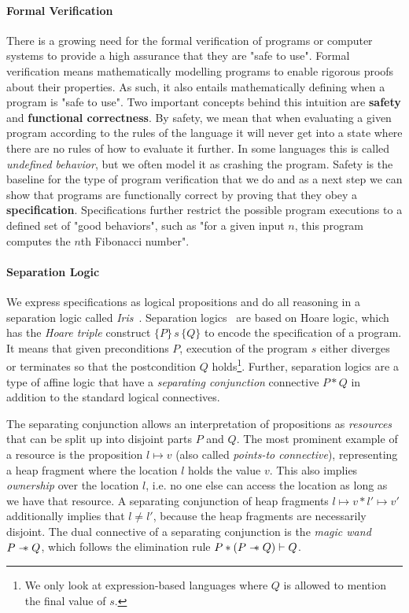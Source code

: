 \paragraph{Formal Verification}
There is a growing need for the formal verification of programs or computer systems to provide a high assurance that they are "safe to use".
Formal verification means mathematically modelling programs to enable rigorous proofs about their properties.
As such, it also entails mathematically defining when a program is "safe to use".
Two important concepts behind this intuition are \textbf{safety} and \textbf{functional correctness}.
By safety, we mean that when evaluating a given program according to the rules of the language
it will never get into a state where there are no rules of how to evaluate it further.
In some languages this is called \emph{undefined behavior}, but we often model it as crashing the program.
Safety is the baseline for the type of program verification that we do and as a next step we can show that programs are functionally correct by proving that they obey a \textbf{specification}.
Specifications further restrict the possible program executions to a defined set of "good behaviors", such as "for a given input \(n\), this program computes the \(n\)th Fibonacci number".

\paragraph{Separation Logic}
We express specifications as logical propositions and do all reasoning in a separation logic called \emph{Iris}~\cite{jung2018iris}.
Separation logics~\cite{?} are based on Hoare logic, which has the \emph{Hoare triple} construct \(\{P\}\,s\,\{Q\}\) to encode the specification of a program.
It means that given preconditions \(P\), execution of the program \(s\) either diverges or terminates so that the postcondition \(Q\) holds\footnote{We only look at expression-based languages where \(Q\) is allowed to mention the final value of \(s\).}.
Further, separation logics are a type of affine logic that have a \emph{separating conjunction} connective \(P \ast Q\) in addition to the standard logical connectives.

The separating conjunction allows an interpretation of propositions as \emph{resources} that can be split up into disjoint parts \(P\) and \(Q\).
The most prominent example of a resource is the proposition \(l \mapsto v\) (also called \emph{points-to connective}), representing a heap fragment where the location \(l\) holds the value \(v\).
This also implies \emph{ownership} over the location \(l\), i.e. no one else can access the location as long as we have that resource.
A separating conjunction of heap fragments \(l \mapsto v \ast l' \mapsto v'\) additionally implies that \(l \neq l'\), because the heap fragments are necessarily disjoint.
The dual connective of a separating conjunction is the \emph{magic wand} \(P \mathrel{-\!\!\ast} Q\), which follows the elimination rule \(P \ast (P \mathrel{-\!\!\ast} Q) \vdash Q\).

